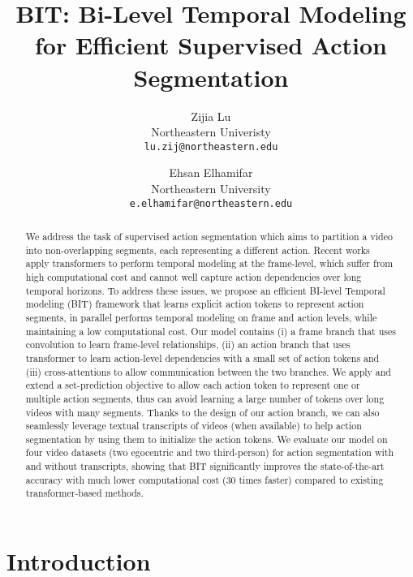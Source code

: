 \documentclass[10pt,twocolumn,letterpaper]{article}
\title{BIT: Bi-Level Temporal Modeling for Efficient Supervised Action Segmentation}
\author{Zijia Lu\\
Northeastern Univeristy\\
{\tt\small lu.zij@northeastern.edu}
\and
Ehsan Elhamifar\\
Northeastern University\\
{\tt\small e.elhamifar@northeastern.edu}
}
\newcommand{\0}{\boldsymbol{0}}
\begin{document}
\maketitle


\begin{abstract}
We address the task of supervised action segmentation which aims to partition a video into non-overlapping segments, each representing a different action. Recent works apply transformers to perform temporal modeling at the frame-level, which suffer from high computational cost and cannot well capture action dependencies over long temporal horizons. To address these issues, we propose an efficient BI-level Temporal modeling (BIT) framework that learns explicit action tokens to represent action segments, in parallel performs temporal modeling on frame and action levels, while maintaining a low computational cost. Our model contains (i) a frame branch that uses convolution to learn frame-level relationships, (ii) an action branch that uses transformer to learn action-level dependencies with a small set of action tokens and (iii) cross-attentions to allow communication between the two branches. We apply and extend a set-prediction objective to allow each action token to represent one or multiple action segments, thus can avoid learning a large number of tokens over long videos with many segments. Thanks to the design of our action branch, we can also seamlessly leverage textual transcripts of videos (when available) to help action segmentation by using them to initialize the action tokens. We evaluate our model on four video datasets (two egocentric and two third-person) for action segmentation with and without transcripts, showing that BIT significantly improves the state-of-the-art accuracy with much lower computational cost (30 times faster) compared to existing transformer-based methods. 
 
 
\end{abstract}

\section{Introduction}  
\end{document}
